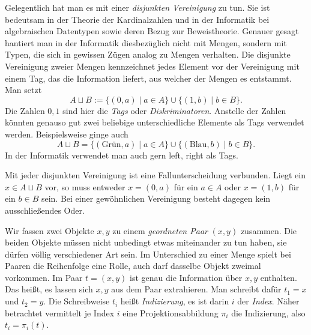 \noindent
Gelegentlich hat man es mit einer \emph{disjunkten Vereinigung}%
 zu tun. Sie ist bedeutsam in der
Theorie der Kardinalzahlen und in der Informatik bei algebraischen
Datentypen sowie deren Bezug zur Beweistheorie. Genauer gesagt hantiert
man in der Informatik diesbezüglich nicht mit Mengen, sondern mit Typen,
die sich in gewissen Zügen analog zu Mengen verhalten. Die disjunkte
Vereinigung zweier Mengen kennzeichnet jedes Element vor der Vereinigung
mit einem Tag, das die Information liefert, aus welcher der Mengen es
entstammt. Man setzt%
\[A\sqcup B := \{(0,a)\mid a\in A\}\cup\{(1,b)\mid b\in B\}.\]
Die Zahlen $0,1$ sind hier die \emph{Tags} oder \emph{Diskriminatoren}.
Anstelle der Zahlen könnten genauso gut zwei beliebige unterschiedliche
Elemente als Tags verwendet werden. Beispielsweise ginge auch%
\[A\sqcup B = \{(\text{Grün},a)\mid a\in A\}\cup\{(\text{Blau},b)\mid b\in B\}.\]
In der Informatik verwendet man auch gern left, right als Tags.

Mit jeder disjunkten Vereinigung ist eine Fallunterscheidung verbunden.
Liegt ein $x\in A\sqcup B$ vor, so muss entweder $x=(0,a)$ für ein
$a\in A$ oder $x=(1,b)$ für ein $b\in B$ sein. Bei einer gewöhnlichen
Vereinigung besteht dagegen kein ausschließendes Oder.

Wir fassen zwei Objekte $x,y$ zu einem \emph{geordneten Paar}%
 $(x,y)$ zusammen. Die beiden
Objekte müssen nicht unbedingt etwas miteinander zu tun haben, sie
dürfen völlig verschiedener Art sein. Im Unterschied zu einer Menge
spielt bei Paaren die Reihenfolge eine Rolle, auch darf dasselbe Objekt
zweimal vorkommen. Im Paar $t=(x,y)$ ist genau die Information über
$x,y$ enthalten. Das heißt, es lassen sich $x,y$ aus dem Paar
extrahieren. Man schreibt dafür $t_1=x$ und $t_2=y$. Die Schreibweise
$t_i$ heißt \emph{Indizierung}, es ist darin $i$ der
\emph{Index}. Näher betrachtet vermittelt je Index $i$
eine Projektionsabbildung $\pi_i$ die Indizierung, also
$t_i = \pi_i(t)$.

